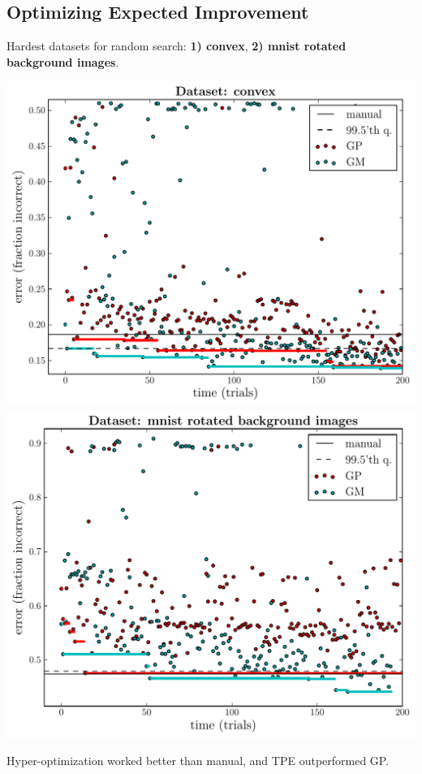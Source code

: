 \documentclass[12pt]{scrartcl}
\begin{document}
\subsection{Optimizing Expected Improvement}

\vspace{-.5em}
Hardest datasets for random search: {\bf 1) convex}, {\bf 2) mnist rotated background images}.

\includegraphics[scale=.365]{figures/plot_histories_gp3,gm_convex.pdf}
\includegraphics[scale=.365]{figures/plot_histories_gp3,gm_mnist_rotated_background_images.pdf}

Hyper-optimization worked better than manual, and TPE outperformed GP.
\onecol
\end{document}
